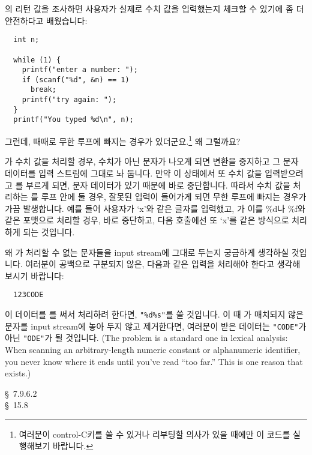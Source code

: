 \begin{faq}
	의 리턴 값을 조사하면 사용자가 실제로 수치 값을 입력했는지
	체크할 수 있기에 좀 더 안전하다고 배웠습니다:

\begin{verbatim}
  int n;

  while (1) {
    printf("enter a number: ");
    if (scanf("%d", &n) == 1)
      break;
    printf("try again: ");
  }
  printf("You typed %d\n", n);
\end{verbatim}
	그런데, 때때로
	무한 루프에 빠지는 경우가 있더군요.\footnote{여러분이 control-C키를
	쓸 수 있거나 리부팅할 의사가 있을 때에만 이 코드를 실행해보기
	바랍니다.}  왜 그럴까요?

\A
	가 수치 값을 처리할 경우, 수치가 아닌 문자가 나오게 되면
	변환을 중지하고 그 문자 데이터를 입력 스트림에 그대로 놔 둡니다.
	만약 이 상태에서 또 수치 값을 입력받으려고 를 부르게
	되면, 문자 데이터가 있기 때문에 바로 중단합니다.  따라서
	수치 값을 처리하는 를 루프 안에 둘 경우, 잘못된 입력이
	들어가게 되면 무한 루프에 빠지는 경우가 가끔 발생합니다.
	예를 들어 사용자가 `x'와 같은 글자를 입력했고, 가
	이를 \%d나 \%f와 같은 포맷으로 처리할 경우, 바로 중단하고,
	다음  호출에선 또 `x'를 같은 방식으로 처리하게 되는 것입니다.

	왜 가 처리할 수 없는 문자들을 input stream에 그대로
	두는지 궁금하게 생각하실 것입니다.  여러분이 공백으로 구분되지 않은,
	다음과 같은 입력을 처리해야 한다고 생각해보시기 바랍니다:
\begin{verbatim}
  123CODE
\end{verbatim}
	이 데이터를 를 써서 처리하려 한다면, \verb+"%d%s"+를
	쓸 것입니다.  이 때 가 매치되지 않은 문자를 input stream에
	놓아 두지 않고 제거한다면, 여러분이 받은 데이터는 \verb+"CODE"+가
	아닌 \verb+"ODE"+가 될 것입니다.
	(The problem is a standard one in lexical analysis:  When scanning
	an arbitrary-length numeric constant or alphanumeric identifier,
	you never know where it ends until you've read ``too far.''
	This is one reason that  exists.)

\R
	\cite{c89} \S\ 7.9.6.2 \\
	\cite{hs} \S\ 15.8 
\end{faq}


